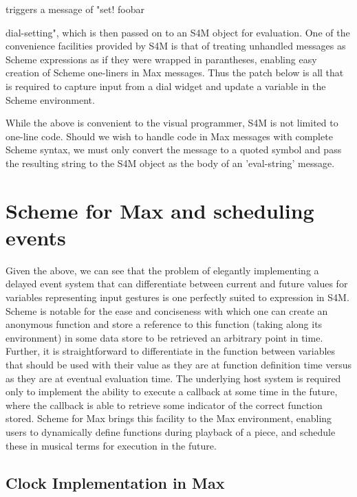 \documentclass[acmsmall]{acmart}
\begin{document}
triggers a message of "set! foobar {dial-setting", which is then passed on to
an S4M object for evaluation. One of the convenience facilities 
provided by S4M is that of treating unhandled messages as Scheme expressions
as if they were wrapped in parantheses, enabling easy creation of Scheme one-liners
in Max messages. Thus the patch below is all that is required to capture input
from a dial widget and update a variable in the Scheme environment.


While the above is convenient to the visual programmer, S4M is not limited 
to one-line code. Should we wish to handle code in Max messages with complete
Scheme syntax, we must only convert the message to a quoted symbol and pass
the resulting string to the S4M object as the body of an 'eval-string' message.


\section{Scheme for Max and scheduling events}

Given the above, we can see that the problem of elegantly implementing 
a delayed event system that can differentiate between current and future values
for variables representing input gestures is one perfectly suited to expression
in S4M. Scheme is notable for the ease and conciseness with which one can create an anonymous function
and store a reference to this function (taking along its environment) in some data
store to be retrieved an arbitrary point in time. Further, it is straightforward
to differentiate in the function between variables that should
be used with their value as they are at function definition time versus
as they are at eventual evaluation time. The underlying host system is required only to 
implement the ability to execute a callback at some time in the future, where 
the callback is able to retrieve some indicator of the correct function stored.
Scheme for Max brings this facility to the Max environment, enabling users to dynamically define
functions during playback of a piece, and schedule these in musical terms
for execution in the future.  




\subsection{Clock Implementation in Max}

}
\end{document}
